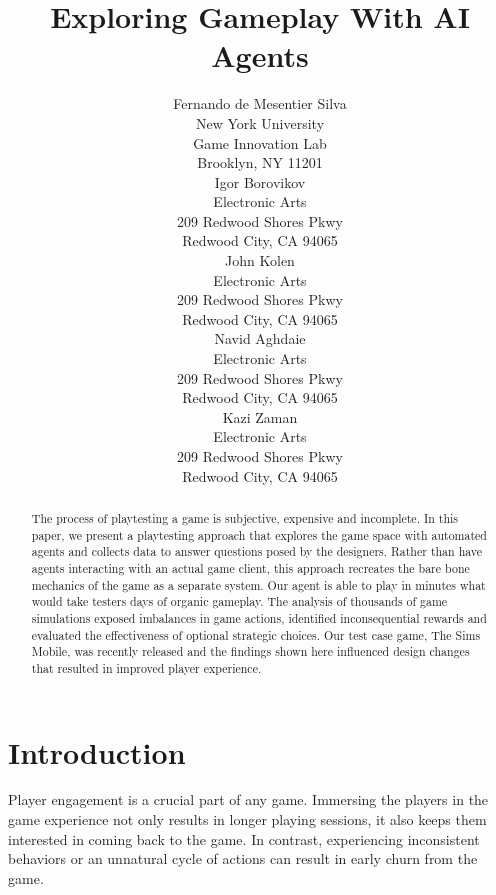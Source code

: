 \documentclass[letterpaper]{article} %
\begin{document}
\title{Exploring Gameplay With AI Agents}
\author{Fernando de Mesentier Silva\\
New York University\\
Game Innovation Lab\\
Brooklyn, NY 11201\\
\And
Igor Borovikov\\
Electronic Arts\\
209 Redwood Shores Pkwy\\
Redwood City, CA 94065\\
\And
John Kolen\\
Electronic Arts\\
209 Redwood Shores Pkwy\\
Redwood City, CA 94065\\
\AND
Navid Aghdaie\\
Electronic Arts\\
209 Redwood Shores Pkwy\\
Redwood City, CA 94065\\
\And
Kazi Zaman\\
Electronic Arts\\
209 Redwood Shores Pkwy\\
Redwood City, CA 94065\\
}
\maketitle
\begin{abstract}

The process of playtesting a game is subjective, expensive and incomplete. In this paper, we present a playtesting approach that explores the game space with automated agents and collects data to answer questions posed by the designers. Rather than have agents interacting with an actual game client, this approach recreates the bare bone mechanics of the game as a separate system. Our agent is able to play in minutes what would take testers days of organic gameplay. The analysis of thousands of game simulations exposed imbalances in game actions, identified inconsequential rewards and evaluated the effectiveness of optional strategic choices.  Our test case game, The Sims Mobile, was recently released and the findings shown here influenced design changes that resulted in improved player experience.
\end{abstract}

\section{Introduction}
Player engagement is a crucial part of any game. Immersing the players in the game experience not only results in longer playing sessions, it also keeps them interested in coming back to the game. In contrast, experiencing inconsistent behaviors or an unnatural cycle of actions can result in early churn from the game.
\end{document}
